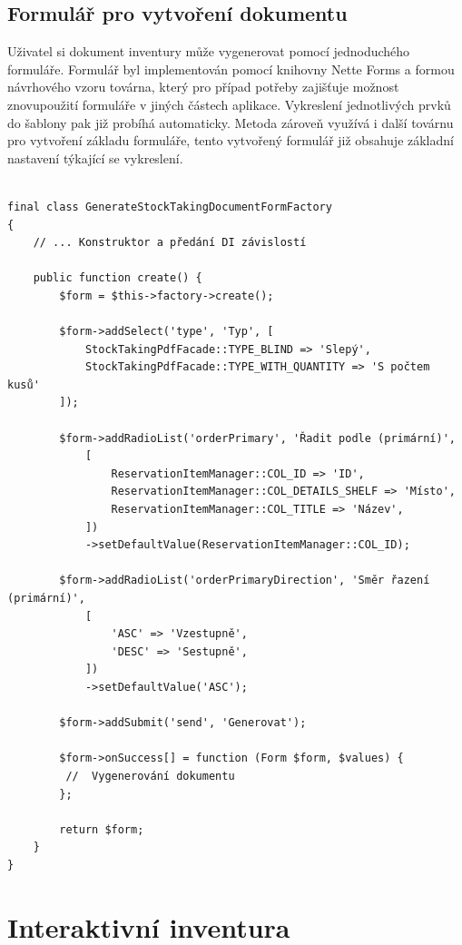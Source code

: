 \subsection{Formulář pro vytvoření dokumentu}

Uživatel si dokument inventury může vygenerovat pomocí jednoduchého formuláře. Formulář byl implementován pomocí knihovny Nette Forms a formou návrhového vzoru továrna, který pro případ potřeby zajišťuje možnost znovupoužití formuláře v jiných částech aplikace. \cite{refactoringFactoryMethod}
Vykreslení jednotlivých prvků do šablony pak již probíhá automaticky. Metoda zároveň využívá i další továrnu pro vytvoření základu formuláře, tento vytvořený formulář již obsahuje základní nastavení týkající se vykreslení. 

\begin{lstlisting}[label=src:GenerateStockTakingDocumentFormFactory,caption={Továrna formuláře pro generování dokumentu s inventurou}]

final class GenerateStockTakingDocumentFormFactory
{
    // ... Konstruktor a předání DI závislostí

    public function create() {
		$form = $this->factory->create();

		$form->addSelect('type', 'Typ', [
            StockTakingPdfFacade::TYPE_BLIND => 'Slepý',
            StockTakingPdfFacade::TYPE_WITH_QUANTITY => 'S počtem kusů'
        ]);

        $form->addRadioList('orderPrimary', 'Řadit podle (primární)',
            [
                ReservationItemManager::COL_ID => 'ID',
                ReservationItemManager::COL_DETAILS_SHELF => 'Místo',
                ReservationItemManager::COL_TITLE => 'Název',
            ])
            ->setDefaultValue(ReservationItemManager::COL_ID);

        $form->addRadioList('orderPrimaryDirection', 'Směr řazení (primární)',
            [
                'ASC' => 'Vzestupně',
                'DESC' => 'Sestupně',
            ])
            ->setDefaultValue('ASC');

		$form->addSubmit('send', 'Generovat');

		$form->onSuccess[] = function (Form $form, $values) {
         //  Vygenerování dokumentu
		};

		return $form;
	}
}

\end{lstlisting}

\section{Interaktivní inventura}

